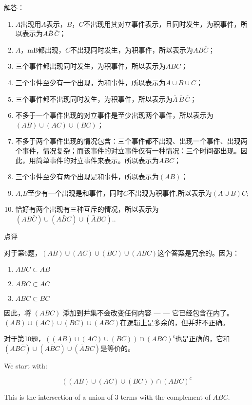 \documentclass[a4paper]{ctexbook}
\begin{document}
解答：

\begin{enumerate}[label=(\arabic*)]
\item $A$出现用$A$表示，$B$，$C$不出现用其对立事件表示，且同时发生，为积事件，所以表示为$A\overline{B}\,\overline{C}$；
\item $A$，mB都出现，$C$不出现同时发生，为积事件，所以表示为$AB\overline{C}$；
\item 三个事件都出现同时发生，为积事件，所以表示为$ABC$；
\item 三个事件至少有一个出现，为和事件，所以表示为$A\cup B\cup C$；
\item 三个事件都不出现同时发生，为积事件，所以表示为$\overline{A}\,\overline{B}\,\overline{C}$；
\item 不多于一个事件出现的对立事件是至少出现两个事件，所以表示为$\overline{(AB) \cup (AC) \cup (BC)}$；
\item 不多于两个事件出现的情况包含：三个事件都不出现、出现一个事件、出现两个事件，情况复杂；而该事件的对立事件仅有一种情况：三个时间都出现。因此，用简单事件的对立事件来表示。所以表示为$\overline{ABC}$；
\item 三个事件至少有两个出现是和事件，所以表示为$(AB)$；
\item $A$,$B$至少有一个出现是和事件，同时$C$不出现为积事件,所以表示为$(A \cup B) C$;
\item 恰好有两个出现有三种互斥的情况，所以表示为$(AB\bar{C}) \cup (A\bar{B}C) \cup (\bar{A}BC)$..
\end{enumerate}

点评

对于第6题，$(AB) \cup (AC) \cup (BC) \cup (ABC)$这个答案是冗余的。因为：

\begin{enumerate}
\item $ABC \subset AB$
\item $ABC \subset AC$
\item $ABC \subset BC$
\end{enumerate}

因此，将 $(ABC)$ 添加到并集不会改变任何内容 — — 它已经包含在内了。$(AB) \cup (AC) \cup (BC) \cup (ABC)$在逻辑上是多余的，但并非不正确。

对于第10题，$((AB) \cup (AC) \cup (BC)) \cap (ABC)^c$也是正确的，它和$(AB\bar{C}) \cup (A\bar{B}C) \cup (\bar{A}BC)$是等价的。

We start with:

$$
((AB) \cup (AC) \cup (BC)) \cap (ABC)^c
$$

This is the intersection of a union of 3 terms with the complement of $ABC$.
\end{document}
